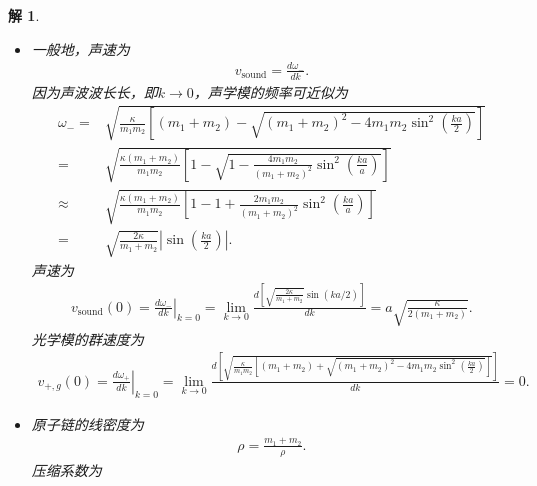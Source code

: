 \documentclass[UTF8,10pt,a4paper]{article}
\theoremstyle{Problem}
\theoremstyle{Solution}
\newtheorem*{sol}{解}
\providecommand{\abs}[1]{\left\lvert#1\right\rvert}
\begin{document}
\begin{sol}
\begin{enumerate}
\begin{itemize}
\begin{align}
                A_y&\left\{\begin{array}{ll}
                    =0,&m_1\leq m_2,\\
                    =\text{任意值},&m_1>m_2.
                \end{array}\right.
            \end{align}
            同一个原胞内质量小的那个原子振动，而另一个原子不动.
            \item[$\triangleright$] 一般地，声速为
            \begin{align}
                v_{\text{sound}}=\frac{d\omega_-}{dk}.
            \end{align}
            因为声波波长长，即$k\rightarrow 0$，声学模的频率可近似为
            \begin{align}
                \nonumber\omega_-=&\sqrt{\frac{\kappa}{m_1m_2}\left[(m_1+m_2)-\sqrt{(m_1+m_2)^2-4m_1m_2\sin^2\left(\frac{ka}{2}\right)}\right]}\\
                \nonumber=&\sqrt{\frac{\kappa(m_1+m_2)}{m_1m_2}\left[1-\sqrt{1-\frac{4m_1m_2}{(m_1+m_2)^2}\sin^2\left(\frac{ka}{a}\right)}\right]}\\
                \nonumber\approx&\sqrt{\frac{\kappa(m_1+m_2)}{m_1m_2}\left[1-1+\frac{2m_1m_2}{(m_1+m_2)^2}\sin^2\left(\frac{ka}{a}\right)\right]}\\
                =&\sqrt{\frac{2\kappa}{m_1+m_2}}\abs{\sin\left(\frac{ka}{2}\right)}.
            \end{align}
            声速为
            \begin{align}
                v_{\text{sound}}(0)=\left.\frac{d\omega_-}{dk}\right\rvert_{k=0}=\lim_{k\rightarrow 0}\frac{d\left[\sqrt{\frac{2\kappa}{m_1+m_2}}\sin(ka/2)\right]}{dk}=a\sqrt{\frac{\kappa}{2(m_1+m_2)}}.
            \end{align}
            光学模的群速度为
            \begin{align}
                v_{+,g}(0)=\left.\frac{d\omega_+}{dk}\right\rvert_{k=0}=\lim_{k\rightarrow 0}\frac{d\left[\sqrt{\frac{\kappa}{m_1m_2}\left[(m_1+m_2)+\sqrt{(m_1+m_2)^2-4m_1m_2\sin^2\left(\frac{ka}{2}\right)}\right]}\right]}{dk}=0.
            \end{align}
            \item[$\triangleright$] 原子链的线密度为
            \begin{align}
                \rho=\frac{m_1+m_2}{\rho}.
            \end{align}
            压缩系数为
            \begin{align}

\end{align}
\end{itemize}
\end{enumerate}
\end{sol}
\end{document}
